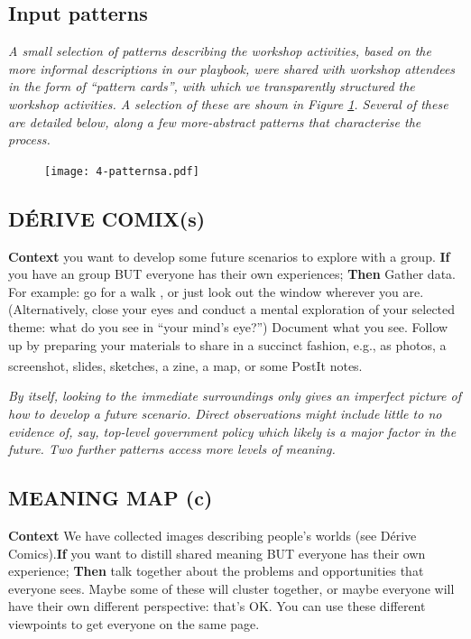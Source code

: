 \documentclass[acmlarge,timestamp]{acmart}
\newcommand{\cognitive}{(c)}
\begin{document}
\subsection{Input patterns} \label{case1-inputs}

\emph{A small selection of patterns describing the workshop
activities, based on the more informal descriptions in our playbook,
were shared with workshop attendees in the form of “pattern cards”,
with which we transparently structured the workshop activities.  A
selection of these are shown in Figure \ref{cards}.  Several of these
are detailed below, along a few more-abstract patterns that
characterise the process.}

\begin{figure}
  \texttt{[image: 4-patternsa.pdf]}
\caption{\label{cards}}
\end{figure}

\subsection*{DÉRIVE COMIX{\hfill (s)}}

\textbf{Context} you want to develop some future scenarios to explore with a group.\newline
\textbf{If} you have an group BUT everyone has their own experiences;\newline
\textbf{Then} Gather data.  For example: go for a walk \cite{debord},  or just look out the window wherever you are.  (Alternatively, close your eyes and conduct a mental exploration of your selected theme: what do you see in “your mind’s eye?”) Document what you see.  Follow up by preparing your materials to share in a succinct fashion, e.g., as photos, a screenshot, slides, sketches, a zine, a map, or some PostIt\textsuperscript{\textregistered} notes.

\smallskip
\noindent \emph{By itself, looking to the immediate surroundings only
gives an imperfect picture of how to develop a future scenario.
Direct observations might include little to no evidence of, say,
top-level government policy which likely is a major factor in the
future.  Two further patterns access more levels of meaning.}

\subsection*{MEANING MAP {\hfill\cognitive}}

\textbf{Context} We have collected images describing people’s worlds
(see {\sc Dérive Comics}).\newline \textbf{If} you want to distill
shared meaning BUT everyone has their own experience;\newline
\textbf{Then} talk together about the problems and opportunities that
everyone sees.  Maybe some of these will cluster together, or maybe
everyone will have their own different perspective: that’s OK.  You
can use these different viewpoints to get everyone on the same
page.\newline\smallskip
\end{document}
